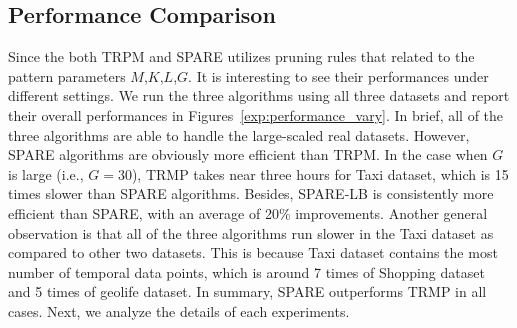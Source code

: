 \subsection{Performance Comparison}
Since the both TRPM and SPARE utilizes pruning rules that related to the pattern parameters $M$,$K$,$L$,$G$. It is interesting to
see their performances under different settings.
We run the three algorithms using all three datasets 
and report their overall performances in Figures~\ref{exp:performance_vary}.
In brief, all of the three algorithms 
are able to handle the large-scaled real
datasets. However, SPARE algorithms are obviously more efficient than TRPM. 
In the case when $G$ is large (i.e., $G=30$), 
TRMP takes near three hours for Taxi dataset, which is 15 times slower than SPARE algorithms. Besides, SPARE-LB is consistently more efficient than SPARE, with an average of 20\% improvements.
Another general observation
is that all of the three algorithms run slower in the Taxi dataset as compared to
other two datasets. This is because Taxi dataset contains
the most number of temporal data points, which is around 7 times of Shopping
dataset and 5 times of geolife dataset.
 In summary, SPARE outperforms TRMP in all cases. Next, we analyze the details of each experiments.

